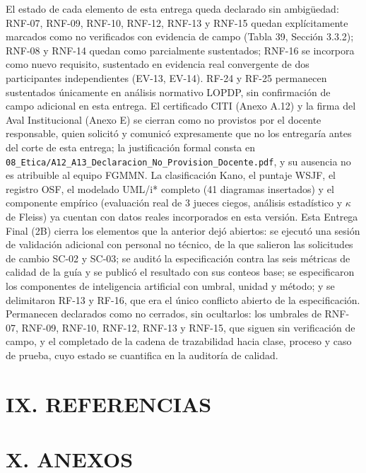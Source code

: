 El estado de cada elemento de esta entrega queda declarado sin ambigüedad: RNF-07, RNF-09, RNF-10, RNF-12, RNF-13 y RNF-15 quedan explícitamente marcados como no verificados con evidencia de campo (Tabla 39, Sección 3.3.2); RNF-08 y RNF-14 quedan como parcialmente sustentados; RNF-16 se incorpora como nuevo requisito, sustentado en evidencia real convergente de dos participantes independientes (EV-13, EV-14). RF-24 y RF-25 permanecen sustentados únicamente en análisis normativo LOPDP, sin confirmación de campo adicional en esta entrega. El certificado CITI (Anexo A.12) y la firma del Aval Institucional (Anexo E) se cierran como no provistos por el docente responsable, quien solicitó y comunicó expresamente que no los entregaría antes del corte de esta entrega; la justificación formal consta en \nolinkurl{08_Etica/A12_A13_Declaracion_No_Provision_Docente.pdf}, y su ausencia no es atribuible al equipo FGMMN. La clasificación Kano, el puntaje WSJF, el registro OSF, el modelado UML/i* completo (41 diagramas insertados) y el componente empírico (evaluación real de 3 jueces ciegos, análisis estadístico y $\kappa$ de Fleiss) ya cuentan con datos reales incorporados en esta versión. Esta Entrega Final (2B) cierra los elementos que la anterior dejó abiertos: se ejecutó una sesión de validación adicional con personal no técnico, de la que salieron las solicitudes de cambio SC-02 y SC-03; se auditó la especificación contra las seis métricas de calidad de la guía y se publicó el resultado con sus conteos base; se especificaron los componentes de inteligencia artificial con umbral, unidad y método; y se delimitaron RF-13 y RF-16, que era el único conflicto abierto de la especificación. Permanecen declarados como no cerrados, sin ocultarlos: los umbrales de RNF-07, RNF-09, RNF-10, RNF-12, RNF-13 y RNF-15, que siguen sin verificación de campo, y el completado de la cadena de trazabilidad hacia clase, proceso y caso de prueba, cuyo estado se cuantifica en la auditoría de calidad.


\section*{IX. REFERENCIAS}


\nocite{*}



\section*{X. ANEXOS}


